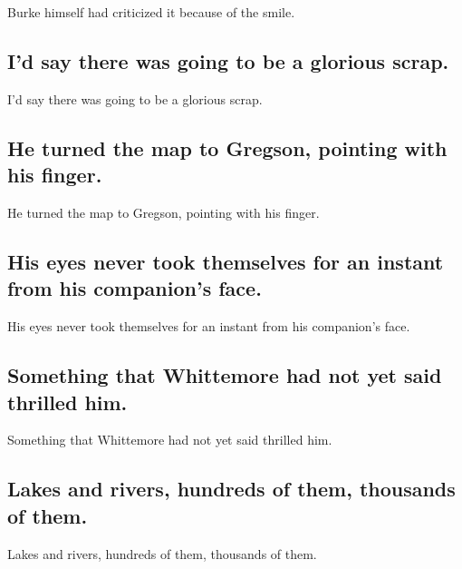 \documentclass[]{article}
\begin{document}
Burke himself had criticized it because of the smile.

\hypertarget{id-say-there-was-going-to-be-a-glorious-scrap.}{%
\subsection{I'd say there was going to be a glorious
scrap.}\label{id-say-there-was-going-to-be-a-glorious-scrap.}}

I'd say there was going to be a glorious scrap.

\hypertarget{he-turned-the-map-to-gregson-pointing-with-his-finger.}{%
\subsection{He turned the map to Gregson, pointing with his
finger.}\label{he-turned-the-map-to-gregson-pointing-with-his-finger.}}

He turned the map to Gregson, pointing with his finger.

\hypertarget{his-eyes-never-took-themselves-for-an-instant-from-his-companions-face.}{%
\subsection{His eyes never took themselves for an instant from his
companion's
face.}\label{his-eyes-never-took-themselves-for-an-instant-from-his-companions-face.}}

His eyes never took themselves for an instant from his companion's face.

\hypertarget{something-that-whittemore-had-not-yet-said-thrilled-him.}{%
\subsection{Something that Whittemore had not yet said thrilled
him.}\label{something-that-whittemore-had-not-yet-said-thrilled-him.}}

Something that Whittemore had not yet said thrilled him.

\hypertarget{lakes-and-rivers-hundreds-of-them-thousands-of-them.}{%
\subsection{Lakes and rivers, hundreds of them, thousands of
them.}\label{lakes-and-rivers-hundreds-of-them-thousands-of-them.}}

Lakes and rivers, hundreds of them, thousands of them.
\end{document}
